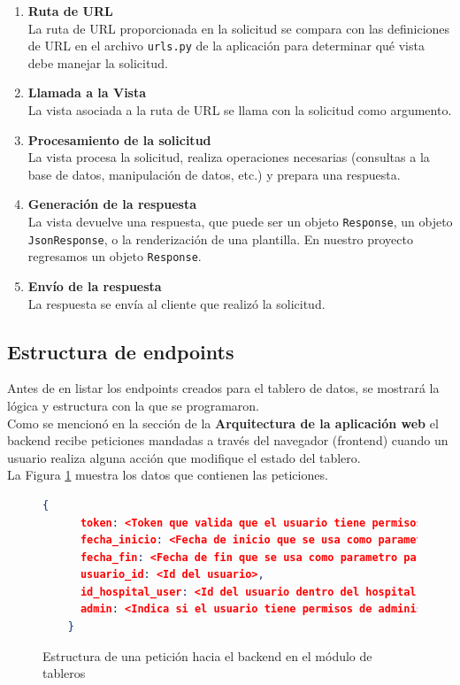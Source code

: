 \begin{enumerate}
    \item \textbf{Ruta de URL}\\
    La ruta de URL proporcionada en la solicitud se compara con las definiciones de URL en el archivo \texttt{urls.py} de la aplicación para determinar qué vista debe manejar la solicitud.

    \item \textbf{Llamada a la Vista}\\
    La vista asociada a la ruta de URL se llama con la solicitud como argumento.

    \item \textbf{Procesamiento de la solicitud}\\ La vista procesa la solicitud, realiza operaciones necesarias (consultas a la base de datos, manipulación de datos, etc.) y prepara una respuesta.

    \item \textbf{Generación de la respuesta}\\
    La vista devuelve una respuesta, que puede ser un objeto \texttt{Response}, un objeto \texttt{JsonResponse}, o la renderización de una plantilla. En nuestro proyecto regresamos un objeto \texttt{Response}.

    \item \textbf{Envío de la respuesta}\\
    La respuesta se envía al cliente que realizó la solicitud.

\end{enumerate}

\subsection{Estructura de endpoints}

Antes de en listar los endpoints creados para el tablero de datos, se mostrará la lógica y estructura con la que se programaron.\\

Como se mencionó en la sección de la \textbf{Arquitectura de la aplicación web} el backend recibe peticiones mandadas a través del navegador (frontend) cuando un usuario realiza alguna acción que modifique el estado del tablero.\\

La Figura \ref{fig:estructura-peticion} muestra los datos que contienen las peticiones.
\begin{figure}[H]
    \centering
    \begin{lstlisting}[language=json, style=json]
    {
      token: <Token que valida que el usuario tiene permisos de acceder al endpoint>,
      fecha_inicio: <Fecha de inicio que se usa como parametro para las consultas>,
      fecha_fin: <Fecha de fin que se usa como parametro para las consultas>,
      usuario_id: <Id del usuario>,
      id_hospital_user: <Id del usuario dentro del hospital al que pertenece>,
      admin: <Indica si el usuario tiene permisos de administrador>
    }
    \end{lstlisting}
    \caption{Estructura de una petición hacia el backend en el módulo de tableros}
    \label{fig:estructura-peticion}
\end{figure}

